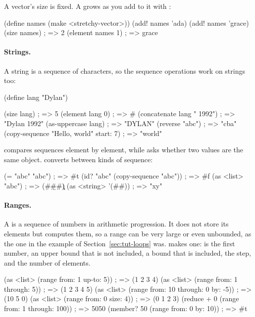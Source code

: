 A vector's size is fixed. A  grows as you add to
it with :

\begin{dylan}
(define names (make <stretchy-vector>))
(add! names 'ada)
(add! names 'grace)
(size names)                    ; => 2
(element names 1)               ; => grace
\end{dylan}

\paragraph{Strings.}
A string is a sequence of characters, so the sequence operations work on
strings too:

\begin{dylan}
(define lang "Dylan")

(size lang)                     ; => 5
(element lang 0)                ; => #\D
(concatenate lang " 1992")      ; => "Dylan 1992"
(as-uppercase lang)             ; => "DYLAN"
(reverse "abc")                 ; => "cba"
(copy-sequence "Hello, world" start: 7)   ; => "world"
\end{dylan}

\code{=} compares sequences element by element, while  asks
whether two values are the same object.  converts between kinds
of sequence:

\begin{dylan}
(= "abc" "abc")                     ; => #t
(id? "abc" (copy-sequence "abc"))   ; => #f
(as <list> "abc")                   ; => (#\a #\b #\c)
(as <string> '(#\x #\y))            ; => "xy"
\end{dylan}

\paragraph{Ranges.}
A  is a sequence of numbers in arithmetic progression. It
does not store its elements but computes them, so a range can be very
large or even unbounded, as the one in the  example of
Section~\ref{sec:tut-loops} was.  makes one:  is
the first number,  an upper bound that is not included,
 a bound that is included,  the step, and
 the number of elements.

\begin{dylan}
(as <list> (range from: 1 up-to: 5))            ; => (1 2 3 4)
(as <list> (range from: 1 through: 5))          ; => (1 2 3 4 5)
(as <list> (range from: 10 through: 0 by: -5))  ; => (10 5 0)
(as <list> (range from: 0 size: 4))             ; => (0 1 2 3)
(reduce + 0 (range from: 1 through: 100))       ; => 5050
(member? 50 (range from: 0 by: 10))             ; => #t
\end{dylan}

